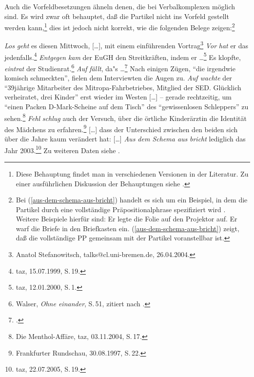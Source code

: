 Auch die Vorfeldbesetzungen ähneln denen, die bei Verbalkomplexen
möglich sind. Es wird zwar oft behauptet, daß die Partikel nicht ins Vorfeld gestellt werden kann,\footnote{
  Diese Behauptung findet man in verschiedenen Versionen in der Literatur. Zu einer
  ausführlichen Diskussion der Behauptungen siehe .%
} dies ist jedoch nicht korrekt, wie die folgenden Belege zeigen:\footnote{
Bei (\ref{aus-dem-schema-aus-bricht}) handelt es sich um ein Beispiel, in dem
die Partikel durch eine vollständige Präpositionalphrase spezifiziert wird \citep{Olsen97a,Olsen99a}.
Weitere Beispiele hierfür sind:
\eal
\ex Er legte die Folie auf den Projektor auf.
\ex Er warf die Briefe in den Briefkasten ein.
\zl 
(\ref{aus-dem-schema-aus-bricht}) zeigt, daß die vollständige PP gemeinsam mit der Partikel voranstellbar ist.%
}

\eal
\label{bsp-partikel-fronting}
\ex \emph{Los} \emph{geht} es diesen Mittwoch, [\ldots], mit einem einführenden Vortrag\footnote{
  Anatol Stefanowitsch, talks@cl.uni-bremen.de, 26.04.2004.
}
\ex
\label{bsp-vor-hat-er-das}
\emph{Vor} \emph{hat} er das jedenfalls.\footnote{
taz, 15.07.1999, S.\,19.
}
\ex \emph{Entgegen} \emph{kam} der EuGH den Streitkräften, indem er \ldots{}\footnote{
taz, 12.01.2000, S.\,1.}
\ex Es klopfte, \emph{eintrat} der Studienrat.\footnote{
Walser, \emph{Ohne einander}, S.\,51, zitiert nach .
}
\ex\label{bsp-auf-faellt}
\emph{Auf}  \emph{fällt}, da"s \ldots{}\footnote{
  .
}
\ex\label{bsp-auf-wachte}
Nach einigen Zügen, "`die irgendwie komisch schmeckten"', fielen dem Interviewten die Augen zu. 
\emph{Auf wachte} der "`39jährige Mitarbeiter des Mitropa-Fahrbetriebes, Mitglied der SED. Glücklich verheiratet, drei Kinder"'
erst %
wieder im Westen [\ldots] -- gerade rechtzeitig, um "`einen Packen D-Mark-Scheine auf dem Tisch"' 
des "`gewissenlosen Schleppers"' zu sehen.\footnote{
  Die Menthol-Affäre, taz, 03.11.2004, S.\,17.
}
\ex \emph{Fehl} \emph{schlug} auch der Versuch, über die örtliche Kinderärztin die Identität des Mädchens zu erfahren.\footnote{
  Frankfurter Rundschau, 30.08.1997, S.\,22.
}
\ex\label{aus-dem-schema-aus-bricht}
{}[\ldots] dass der Unterschied zwischen den beiden sich über die Jahre kaum verändert hat: [\ldots]
    \emph{Aus dem Schema aus} \emph{bricht} lediglich das Jahr 2003.\footnote{
    taz, 22.07.2005, S.\,19.
}
\zl
Zu weiteren Daten siehe .


